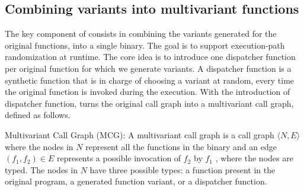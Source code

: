 \subsection*{Combining variants into multivariant functions}

The key component of \tool consists in combining the variants generated for the original functions, into a single binary.
The goal is to support execution-path randomization at runtime.
The core idea is to introduce one dispatcher function per original function for which we generate variants.
A dispatcher function is a synthetic function that is in charge of choosing a variant at random, every time the original function is invoked during the execution.
With the introduction of dispatcher function,  \tool turns the original call graph into a multivariant call graph, defined as follows. 

\begin{definition}{Multivariant Call Graph (MCG):}\label{def:EP}
    A multivariant call graph is a call graph $\langle N,E \rangle$ where the nodes in $N$ represent all the functions in the binary and an edge $(f_1,f_2) \in E$ represents a possible invocation of $f_2$ by $f_1$  \cite{ryder1979}, where the nodes are typed. The nodes in $N$ have three possible types: a function present in the original program,  a generated function variant, or a dispatcher function.
\end{definition}


